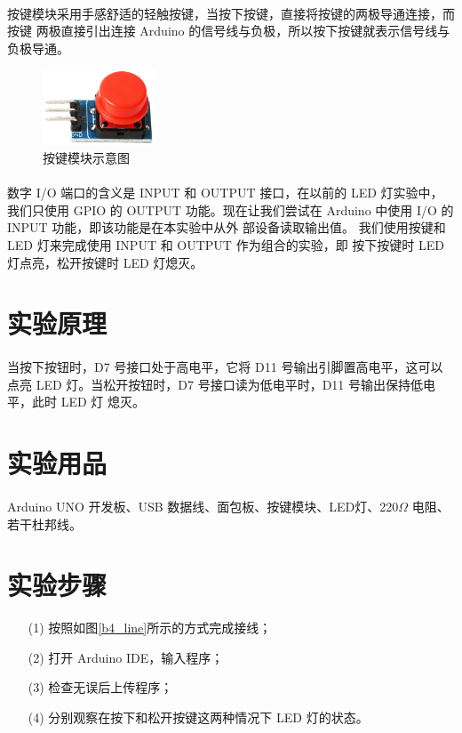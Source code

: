 \documentclass[UTF8, oneside]{ctexbook}
\begin{document}
\paragraph{}
按键模块采用手感舒适的轻触按键，当按下按键，直接将按键的两极导通连接，而按键
两极直接引出连接 Arduino 的信号线与负极，所以按下按键就表示信号线与负极导通。
\begin{figure}[h]
    \centering
    \includegraphics[width=0.3\textwidth]{./result/basic/4/button.png}
    \caption{按键模块示意图}
    \label{button}
\end{figure}
\paragraph{}
数字 I/O 端口的含义是 INPUT 和 OUTPUT 接口，在以前的 LED 灯实验中，我们只使用 GPIO 的 
OUTPUT 功能。现在让我们尝试在 Arduino 中使用 I/O 的 INPUT 功能，即该功能是在本实验中从外
部设备读取输出值。 我们使用按键和 LED 灯来完成使用 INPUT 和 OUTPUT 作为组合的实验，即
按下按键时 LED 灯点亮，松开按键时 LED 灯熄灭。

\section{实验原理}
\paragraph{}
当按下按钮时，D7 号接口处于高电平，它将 D11 号输出引脚置高电平，这可以点亮 
LED 灯。当松开按钮时，D7 号接口读为低电平时，D11 号输出保持低电平，此时 LED 灯
熄灭。

\section{实验用品}
\paragraph{}
Arduino UNO 开发板、USB 数据线、面包板、按键模块、LED灯、220$\Omega$ 电阻、若干杜邦线。

\section{实验步骤}
\begin{itemize}
    \item[(1)] 按照如图\ref{b4_line}所示的方式完成接线；
    \item[(2)] 打开 Arduino IDE，输入程序；
    \item[(3)] 检查无误后上传程序；
    \item[(4)] 分别观察在按下和松开按键这两种情况下 LED 灯的状态。    
\end{itemize}
\end{document}
